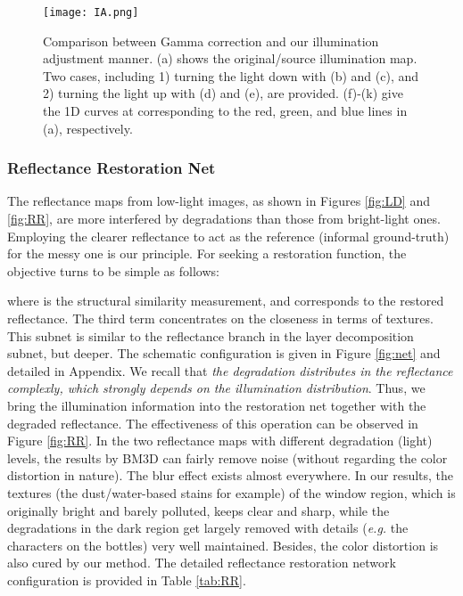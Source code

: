 \documentclass[journal,10pt,compsoc]{IEEEtran}
\begin{document}
\begin{figure*}[t]
	
	\begin{center}
			\texttt{[image: IA.png]}
	\end{center}
	\caption{Comparison between Gamma correction and our illumination adjustment manner. (a) shows the original/source illumination map. Two cases, including 1) turning the light down with  (b) and  (c), and 2) turning the light up with  (d) and  (e), are provided. (f)-(k) give the 1D curves at  corresponding to the red, green, and blue lines in (a), respectively.}
	\vspace{-0pt}
	\label{fig:IA}
\end{figure*}



\subsubsection{Reflectance Restoration Net}
The reflectance maps from low-light images, as shown in Figures \ref{fig:LD} and \ref{fig:RR}, are more interfered by degradations than those from bright-light ones. Employing the clearer reflectance to act as the reference (informal ground-truth) for the messy one is our principle. For seeking a restoration function, the objective turns to be simple as follows:

where  is the structural similarity measurement, and  corresponds to the restored reflectance. The third term concentrates on the closeness in terms of textures. This subnet is similar to the reflectance branch in the layer decomposition subnet, but deeper. The schematic configuration is given in Figure \ref{fig:net} and detailed in Appendix. We recall that {\it the degradation distributes in the reflectance complexly, which strongly depends on the illumination distribution}. Thus, we bring the illumination information into the restoration net together with the degraded reflectance. The effectiveness of this operation can be observed in Figure \ref{fig:RR}. In the two reflectance maps with different degradation (light) levels, the results by BM3D can fairly remove noise (without regarding the color distortion in nature). The blur effect exists almost everywhere. In our results, the textures (the dust/water-based stains for example) of the window region, which is originally bright and barely polluted, keeps clear and sharp, while the degradations in the dark region get largely removed with details ({\it e.g.} the characters on the bottles) very well maintained. Besides, the color distortion is also cured by our method.  The detailed reflectance restoration network configuration is provided in Table \ref{tab:RR}.
\end{document}
